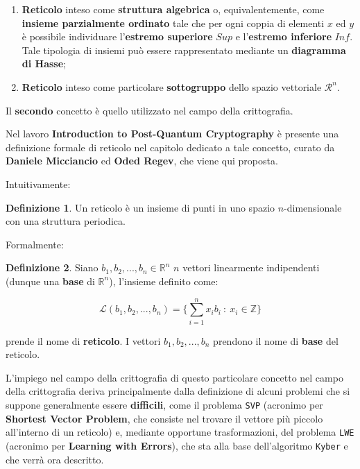 \documentclass[a4paper, 12pt, oneside]{article}
\theoremstyle{definition}
\newtheorem{definition}{Definizione}
\begin{document}
\begin{enumerate}
    \item \textbf{Reticolo} inteso come \textbf{struttura algebrica} o, equivalentemente, come \textbf{insieme parzialmente ordinato} tale che per ogni coppia di elementi $x$ ed $y$ è possibile individuare l'\textbf{estremo superiore} $Sup$ e l'\textbf{estremo inferiore} $Inf$. Tale tipologia di insiemi può essere rappresentato mediante un \textbf{diagramma di Hasse};
    \item \textbf{Reticolo} inteso come particolare \textbf{sottogruppo} dello spazio vettoriale $\mathcal{R}^n$.
\end{enumerate}

Il \textbf{secondo} concetto è quello utilizzato nel campo della crittografia.

Nel lavoro \textbf{Introduction to Post-Quantum Cryptography} \cite{Bernstein2009} è presente una definizione formale di reticolo nel capitolo dedicato a tale concetto, curato da \textbf{Daniele Micciancio} ed \textbf{Oded Regev}, che viene qui proposta.

Intuitivamente:
\begin{definition}
    Un reticolo è un insieme di punti in uno spazio $n$-dimensionale con una struttura periodica.
\end{definition}

Formalmente:

\begin{definition}
    Siano $b_1, b_2, ..., b_n \in \mathbb{R} ^n$ $n$ vettori linearmente indipendenti (dunque una \textbf{base} di $\mathbb{R}^n$), l'insieme definito come:

    \begin{center}
        \[\mathcal{L}(b_1,b_2,...,b_n) = \Biggl \{ \sum_{i = 1}^{n}x_ib_i \: : \: x_i \in \mathbb{Z} \Biggl\}\]
    \end{center}

    prende il nome di \textbf{reticolo}. I vettori $b_1, b_2, ..., b_n$ prendono il nome di \textbf{base} del reticolo.
\end{definition}

L'impiego nel campo della crittografia di questo particolare concetto nel campo della crittografia deriva principalmente dalla definizione di alcuni problemi che si suppone generalmente essere \textbf{difficili}, come il problema \texttt{SVP} (acronimo per \textbf{Shortest Vector Problem}, che consiste nel trovare il vettore più piccolo all'interno di un reticolo) e, mediante opportune trasformazioni, del problema \texttt{LWE} (acronimo per \textbf{Learning with Errors}), che sta alla base dell'algoritmo \texttt{Kyber} e che verrà ora descritto.
\end{document}
